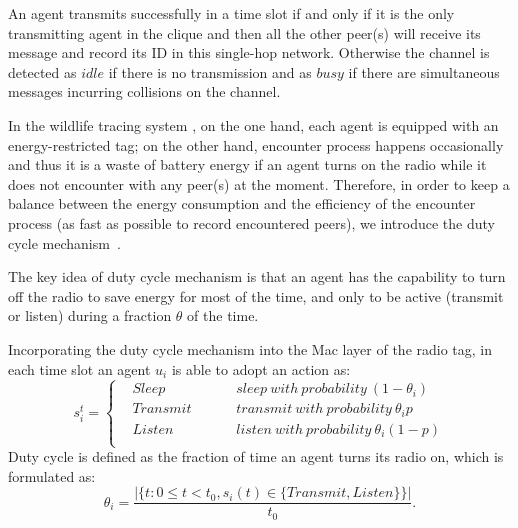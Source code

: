 An agent transmits successfully in a time slot if and only if 
it is the only transmitting agent in the clique and then all the other peer(s) will
receive its message and record its ID in this single-hop network. 
Otherwise the channel is detected
as $idle$ if there is no transmission and as $busy$ if there 
are simultaneous messages incurring collisions on the channel.

In the wildlife tracing system {\sysname}, 
on the one hand,
each agent is equipped with an energy-restricted tag;
on the other hand, encounter process happens occasionally and thus
it is a waste of battery energy if an agent turns on the radio while it does 
not encounter with any peer(s) at the moment. 
Therefore, in order to keep a balance between the energy consumption 
and the efficiency of the encounter process (as fast as possible to 
record encountered peers), we introduce 
the duty cycle mechanism~\cite{Zhang2017Performance}.

The key idea of duty cycle mechanism is that 
an agent has the capability to turn off the radio to save
energy for most of the time, and only to be active 
(transmit or listen) during a fraction $\theta$ of the time.

Incorporating the duty cycle mechanism into the Mac layer of the radio tag, 
in each time slot an agent $u_i$ is able to adopt an action as:
$$ s_i^t=\left\{
\begin{aligned}
&Sleep  & & & &{sleep~ with~ probability~ (1-\theta_i)}  	 \\
&Transmit  & & & &{transmit~ with~ probability~ \theta_i p}	\\
&Listen  & & & &{listen~ with~ probability~\theta_i(1-p)}	\\
\end{aligned}
\right.
$$
Duty cycle is defined as the fraction of time an agent turns its radio on, 
which is formulated as:
$$\theta_i=\frac{|\{t: 0\leq t<t_0, s_i(t) \in \{Transmit,Listen\}\}|}{t_0}.
$$



